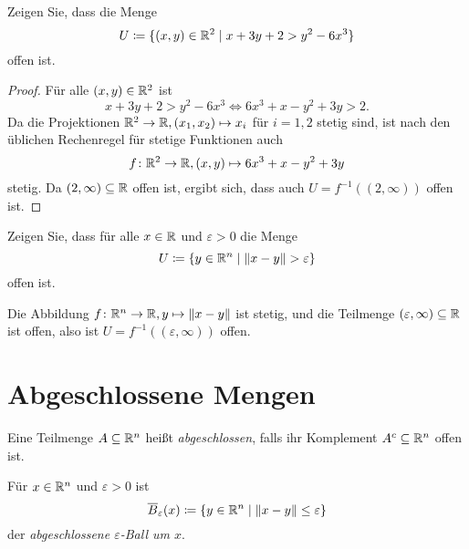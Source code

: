 \documentclass[a4paper,10pt]{article}
\begin{document}
\begin{question}
 Zeigen Sie, dass die Menge
 \[
  U \coloneqq \{(x,y) \in \mathbb{R}^2 \mid x + 3y + 2 > y^2 - 6x^3 \}
 \]
 offen ist.
\end{question}
\begin{proof}
 Für alle $(x,y) \in \mathbb{R}^2$ ist
 \[
  x + 3y + 2 > y^2 - 6x^3
  \Leftrightarrow 6x^3 + x - y^2 + 3y > 2.
 \]
 Da die Projektionen $\mathbb{R}^2 \to \mathbb{R}, (x_1, x_2) \mapsto x_i$ für $i=1,2$ stetig sind, ist nach den üblichen Rechenregel für stetige Funktionen auch
 \[
  f \colon \mathbb{R}^2 \to \mathbb{R}, (x,y) \mapsto 6x^3 + x - y^2 + 3y
 \]
 stetig. Da $(2,\infty) \subseteq \mathbb{R}$ offen ist, ergibt sich, dass auch $U = f^{-1}((2,\infty))$ offen ist.
\end{proof}


\begin{question}
 Zeigen Sie, dass für alle $x \in \mathbb{R}$ und $\varepsilon > 0$ die Menge
 \[
  U \coloneqq \{y \in \mathbb{R}^n \mid \|x-y\| > \varepsilon\}
 \]
 offen ist.
\end{question}
\begin{solution}
 Die Abbildung $f \colon \mathbb{R}^n \to \mathbb{R}, y \mapsto \|x-y\|$ ist stetig, und die Teilmenge $(\varepsilon,\infty) \subseteq \mathbb{R}$ ist offen, also ist $U = f^{-1}((\varepsilon,\infty))$ offen.
\end{solution}





\section{Abgeschlossene Mengen}


\begin{defi}
 Eine Teilmenge $A \subseteq \mathbb{R}^n$ heißt \emph{abgeschlossen}, falls ihr Komplement $A^c \subseteq \mathbb{R}^n$ offen ist.
\end{defi}


\begin{defi}
 Für $x \in \mathbb{R}^n$ und $\varepsilon > 0$ ist
 \[
  \overline{B}_\varepsilon(x) \coloneqq \{y \in \mathbb{R}^n \mid \|x-y\| \leq \varepsilon \}
 \]
 der \emph{abgeschlossene $\varepsilon$-Ball um $x$}.
\end{defi}
\end{document}
